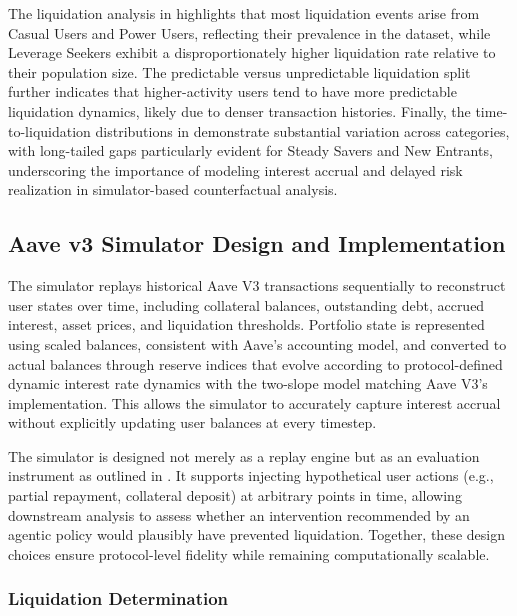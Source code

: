 \documentclass[manuscript,screen,review]{acmart}
\begin{document}
The liquidation analysis in  highlights that most liquidation events arise from Casual Users and Power Users, reflecting their prevalence in the dataset, while Leverage Seekers exhibit a disproportionately higher liquidation rate relative to their population size. The predictable versus unpredictable liquidation split further indicates that higher-activity users tend to have more predictable liquidation dynamics, likely due to denser transaction histories. Finally, the time-to-liquidation distributions in  demonstrate substantial variation across categories, with long-tailed gaps particularly evident for Steady Savers and New Entrants, underscoring the importance of modeling interest accrual and delayed risk realization in simulator-based counterfactual analysis.

\subsection{Aave v3 Simulator Design and Implementation}
The simulator replays historical Aave V3 transactions sequentially to reconstruct user states over time, including collateral balances, outstanding debt, accrued interest, asset prices, and liquidation thresholds. Portfolio state is represented using scaled balances, consistent with Aave’s accounting model, and converted to actual balances through reserve indices that evolve according to protocol-defined dynamic interest rate dynamics with the two-slope model matching Aave V3's implementation. This allows the simulator to accurately capture interest accrual without explicitly updating user balances at every timestep.

The simulator is designed not merely as a replay engine but as an evaluation instrument as outlined in . It supports injecting hypothetical user actions (e.g., partial repayment, collateral deposit) at arbitrary points in time, allowing downstream analysis to assess whether an intervention recommended by an agentic policy would plausibly have prevented liquidation.
Together, these design choices ensure protocol-level fidelity while remaining computationally scalable.

\subsubsection{Liquidation Determination}
\label{sec:liquidation-detetmination}
\end{document}
